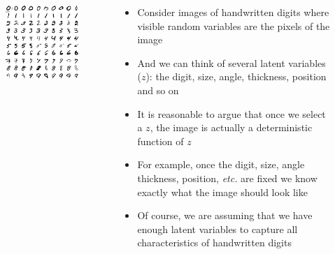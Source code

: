 \begin{frame}
	\begin{columns}
		\begin{overlayarea}{\textwidth}{\textheight}
			\vspace{3pt}
			\begin{figure}
				\centering
				\includegraphics[scale=0.3]{images/mnist.png}
			\end{figure}
		\end{overlayarea}
		\begin{overlayarea}{\textwidth}{\textheight}
			\begin{itemize}\justifying
				\item<1-> Consider images of handwritten digits where visible random variables are the pixels of the image
				\item<2-> And we can think of several latent variables ($z$): the digit, size, angle, thickness, position and so on
				\item<3-> It is reasonable to argue that once we select a $z$, the image is actually a deterministic function of $z$
				\item<4-> For example, once the digit, size, angle thickness, position, \textit{etc.} are fixed we know exactly what the image should look like
				\item<5-> Of course, we are assuming that we have enough latent variables to capture all characteristics of handwritten digits 
			\end{itemize}
		\end{overlayarea}
	\end{columns}
\end{frame}


